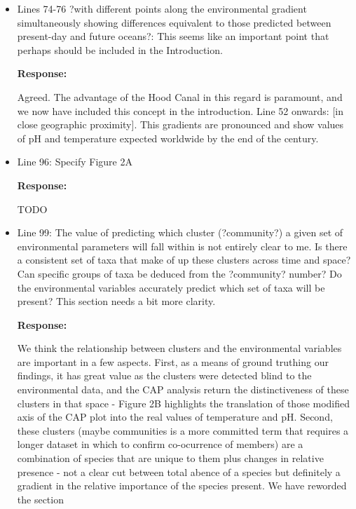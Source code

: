 \documentclass[11pt]{article}
\begin{document}
\begin{linenumbers}
\begin{itemize}
In an effort to declutter Figure 3, and following suggestions from reviewer 1, we have focused the figure in those species showing a more dramatic change in suitability. The new version of the figure has two panels (A and B) and we refer to them specifically in the text

\item{Lines 74-76 ?with different points along the environmental gradient simultaneously showing differences equivalent to those predicted between present-day and future oceans?: This seems like an important point that perhaps should be included in the Introduction.}

\textbf{Response:}

Agreed. The advantage of the Hood Canal in this regard is paramount, and we now have included this concept in the introduction.  Line 52 onwards: {\color{red} [in close geographic proximity]. This gradients are pronounced and show values of pH and temperature expected worldwide by the end of the century}.

\item{Line 96: Specify Figure 2A}

\textbf{Response:}

TODO

\item{Line 99: The value of predicting which cluster (?community?) a given set of environmental parameters will fall within is not entirely clear to me. Is there a consistent set of taxa that make of up these clusters across time and space? Can specific groups of taxa be deduced from the ?community? number? Do the environmental variables accurately predict which set of taxa will be present? This section needs a bit more clarity.}

\textbf{Response:}

We think the relationship between clusters and the environmental variables are important in a few aspects. First, as a means of ground truthing our findings, it has great value as the clusters were detected blind to the environmental data, and the CAP analysis return the distinctiveness of these clusters in that space - Figure 2B highlights the translation of those modified axis of the CAP plot into the real values of temperature and pH. Second, these clusters (maybe communities is a more committed term that requires a longer dataset in which to confirm co-ocurrence of members) are a combination of species that are unique to them plus changes in relative presence - not a clear cut between total abence of a species but definitely a gradient in the relative importance of the species present.
We have reworded the section


\end{itemize}
\end{linenumbers}
\end{document}
